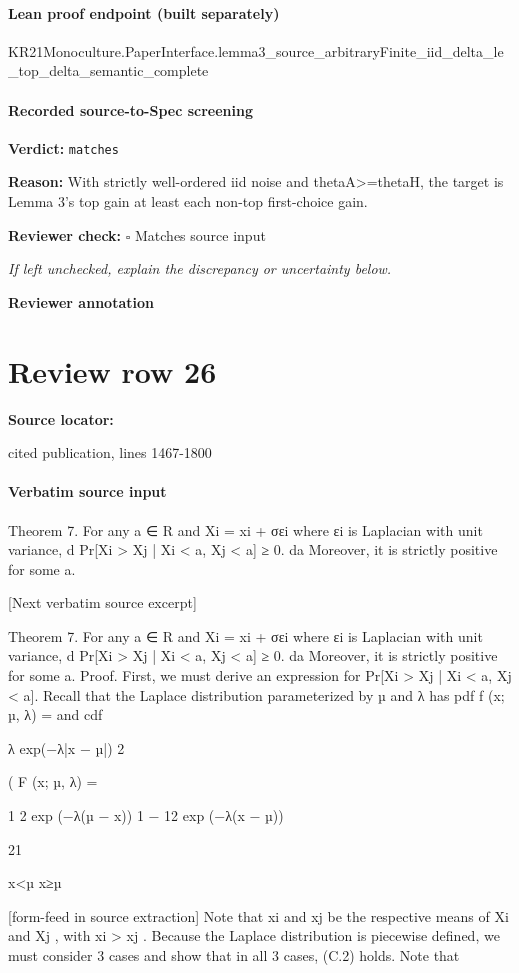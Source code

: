 \documentclass[10pt]{article}
\newcommand{\reviewerbox}{%
  \par\noindent\fbox{\parbox{0.96\linewidth}{\rule{0pt}{0.38in}}}\par
}
\newcommand{\reviewmatch}[1]{%
  \par\noindent\textbf{Reviewer check:} $\square$\; #1\par
  \noindent\emph{If left unchecked, explain the discrepancy or uncertainty below.}\par
}
\begin{document}
\paragraph{Lean proof endpoint (built separately)}\begin{ReviewVerbatim}
KR21Monoculture.PaperInterface.lemma3_source_arbitraryFinite_iid_delta_le_top_delta_semantic_complete
\end{ReviewVerbatim}

\paragraph{Recorded source-to-Spec screening}
\textbf{Verdict:} \texttt{matches}
\\
{\raggedright
\textbf{Reason:} With strictly well-\allowbreak{}ordered iid noise and thetaA>=thetaH, the target is Lemma 3's top gain at least each non-\allowbreak{}top first-\allowbreak{}choice gain.\allowbreak{}
\par}
\reviewmatch{Matches source input}
\noindent\textbf{Reviewer annotation}\par
\reviewerbox
\clearpage
\hypertarget{source-claim-aceb5e75cb75d8b8}{}
\section*{Review row 26}
\textbf{Source locator:} {\footnotesize\raggedright cited publication, lines 1467-\allowbreak{}1800\par}
\paragraph{Verbatim source input}
\begin{ReviewVerbatim}
Theorem 7. For any a ∈ R and Xi = xi + σεi where εi is Laplacian with unit variance,
d
Pr[Xi > Xj | Xi < a, Xj < a] ≥ 0.
da
Moreover, it is strictly positive for some a.

[Next verbatim source excerpt]

Theorem 7. For any a ∈ R and Xi = xi + σεi where εi is Laplacian with unit variance,
d
Pr[Xi > Xj | Xi < a, Xj < a] ≥ 0.
da
Moreover, it is strictly positive for some a.
Proof. First, we must derive an expression for Pr[Xi > Xj | Xi < a, Xj < a]. Recall that the Laplace
distribution parameterized by µ and λ has pdf
f (x; µ, λ) =
and cdf

λ
exp(−λ|x − µ|)
2

(
F (x; µ, λ) =

1
2 exp (−λ(µ − x))
1 − 12 exp (−λ(x − µ))

21

x<µ
x≥µ


[form-feed in source extraction]
Note that xi and xj be the respective means of Xi and Xj , with xi > xj . Because the Laplace distribution
is piecewise defined, we must consider 3 cases and show that in all 3 cases, (C.2) holds. Note that
\end{ReviewVerbatim}
\end{document}

